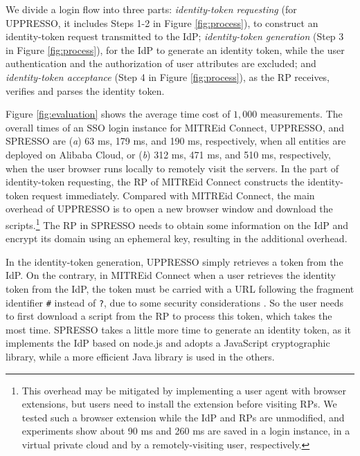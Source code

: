 We divide a login flow into three parts:
{\em identity-token requesting} (for UPPRESSO, it includes Steps 1-2 in Figure \ref{fig:process}),
  to construct an identity-token request transmitted to the IdP;
{\em identity-token generation} (Step 3 in Figure \ref{fig:process}),
    for the IdP to generate an identity token, while the user authentication and  the authorization of user attributes are excluded;
and {\em identity-token acceptance} (Step 4 in Figure \ref{fig:process}),
    as the RP receives, verifies and parses the identity token.


Figure \ref{fig:evaluation} shows
        the average time cost of $1,000$ measurements.
The overall times of an SSO login instance for MITREid Connect, UPPRESSO, and SPRESSO are
 (\emph{a}) 63 ms, 179 ms, and 190 ms, respectively, when all entities are deployed on Alibaba Cloud,
or
 (\emph{b})
312 ms, 471 ms, and 510 ms, respectively, when the user browser runs locally to remotely visit the servers.
%
In the part of identity-token requesting, %
the RP of MITREid Connect constructs the identity-token request immediately.
Compared with MITREid Connect, the main overhead of UPPRESSO is to open a new browser window and download the scripts.\footnote{This overhead may be mitigated %
    by implementing a user agent with browser extensions,
but users need to install the extension
    before visiting RPs.
We tested such a browser extension while the IdP and RPs are unmodified,
and experiments show about 90 ms and 260 ms are saved in a login instance,
    in a virtual private cloud and by a remotely-visiting user, respectively.}
The RP in SPRESSO needs  to obtain some information on the IdP  %
     and encrypt its domain using an ephemeral key, resulting in the additional overhead.




In the identity-token generation,
UPPRESSO simply retrieves a token from the IdP.
On the contrary, in MITREid Connect when a user retrieves the identity token from the IdP,
 the token must be carried with a URL following the fragment identifier \verb+#+ instead of \verb+?+, due to some security considerations \cite{de2014oauth}.
So the user needs to first download a script from the RP to process this token, which takes the most time.
SPRESSO takes a little more time to generate an identity token,
    as it implements the IdP based on node.js and adopts a JavaScript cryptographic library,
 while a more efficient Java library is used in the others.


